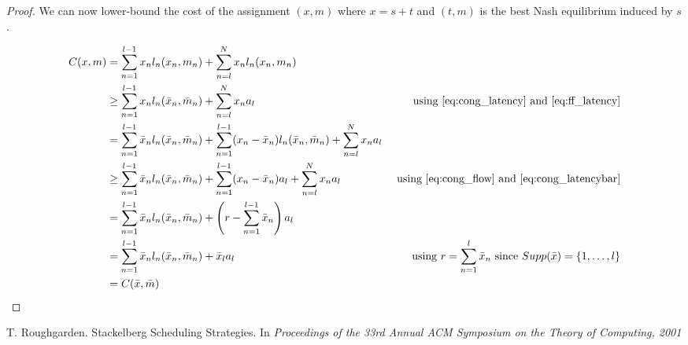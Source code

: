 \begin{proof}
We can now lower-bound the cost of the assignment $(x, m)$ where $x = s+t$ and $(t, m)$ is the best Nash equilibrium induced by $s$.

\begin{align*}
C(x, m) 
&= \sum_{n = 1}^{l-1} x_n l_n(x_n, m_n) + \sum_{n = l}^{N} x_n l_n(x_n, m_n)\\
&\geq \sum_{n = 1}^{l-1} x_n l_n(\bar{x}_n, \bar{m}_n) + \sum_{n = l}^{N} x_n a_{l} 
&\text{ using \ref{eq:cong_latency} and \ref{eq:ff_latency}} \\
&= \sum_{n = 1}^{l-1} \bar{x}_n l_n(\bar{x}_n, \bar{m}_n) + \sum_{n = 1}^{l-1} (x_n - \bar{x}_n) l_n(\bar{x}_n, \bar{m}_n) + \sum_{n = l}^{N} x_n a_{l} \\
&\geq \sum_{n = 1}^{l-1} \bar{x}_n l_n(\bar{x}_n, \bar{m}_n) + \sum_{n = 1}^{l-1} (x_n - \bar{x}_n) a_{l} + \sum_{n = l}^{N} x_n a_{l}
&\text{ using \ref{eq:cong_flow} and \ref{eq:cong_latencybar}} \\
&= \sum_{n = 1}^{l-1} \bar{x}_n l_n(\bar{x}_n, \bar{m}_n) + 
\left( r - \sum_{n = 1}^{l-1}\bar{x}_n \right) a_{l}\\
&= \sum_{n = 1}^{l-1} \bar{x}_n l_n(\bar{x}_n, \bar{m}_n) + \bar{x}_l a_{l} 
&\text{ using } r = \sum_{n = 1}^l \bar{x}_n \text{ since } Supp(\bar{x}) = \{ 1, \dots, l\}\\
&= C(\bar{x}, \bar{m})
\end{align*}

\end{proof}



\begin{thebibliography}{8}


 T. Roughgarden. Stackelberg Scheduling Strategies. In \emph{Proceedings of the 33rd Annual ACM Symposium on the Theory of Computing, 2001}

\end{thebibliography}

